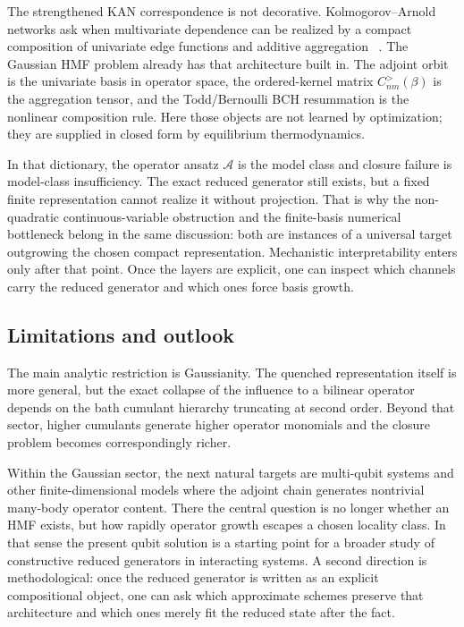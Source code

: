 The strengthened KAN correspondence is not decorative. Kolmogorov--Arnold
networks ask when multivariate dependence can be realized by a compact
composition of univariate edge functions and additive aggregation
~\cite{liuKANKolmogorovArnoldNetworks2024}. The Gaussian HMF problem already
has that architecture built in. The adjoint orbit is the univariate basis in
operator space, the ordered-kernel matrix $C^>_{nm}(\beta)$ is the aggregation
tensor, and the Todd/Bernoulli BCH resummation is the nonlinear composition
rule. Here those objects are not learned by optimization; they are supplied in
closed form by equilibrium thermodynamics.

In that dictionary, the operator ansatz $\mathcal A$ is the model class and
closure failure is model-class insufficiency. The exact reduced generator still
exists, but a fixed finite representation cannot realize it without projection.
That is why the non-quadratic continuous-variable obstruction and the
finite-basis numerical bottleneck belong in the same discussion: both are
instances of a universal target outgrowing the chosen compact representation.
Mechanistic interpretability enters only after that point. Once the layers are
explicit, one can inspect which channels carry the reduced generator and which
ones force basis growth.

\subsection*{Limitations and outlook}

The main analytic restriction is Gaussianity. The quenched representation itself
is more general, but the exact collapse of the influence to a bilinear operator
depends on the bath cumulant hierarchy truncating at second order. Beyond that
sector, higher cumulants generate higher operator monomials and the closure
problem becomes correspondingly richer.

Within the Gaussian sector, the next natural targets are multi-qubit systems and
other finite-dimensional models where the adjoint chain generates nontrivial
many-body operator content. There the central question is no longer whether an
HMF exists, but how rapidly operator growth escapes a chosen locality class. In
that sense the present qubit solution is a starting point for a broader study
of constructive reduced generators in interacting systems. A second direction
is methodological: once the reduced generator is written as an explicit
compositional object, one can ask which approximate schemes preserve that
architecture and which ones merely fit the reduced state after the fact.
